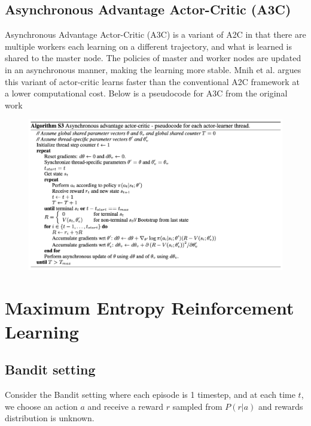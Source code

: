 \documentclass[12pt]{report}
\begin{document}
\subsection{Asynchronous Advantage Actor-Critic (A3C)}

Asynchronous Advantage Actor-Critic (A3C) is a variant of A2C in that there are multiple workers each learning on a different trajectory, and what is learned is shared to the master node. The policies of master and worker nodes are updated in an asynchronous manner, making the learning more stable. Mnih et al. \cite{mnih2016asynchronous} argues this variant of actor-critic learns faster than the conventional A2C framework at a lower computational cost. Below is a pseudocode for A3C from the original work \cite{mnih2016asynchronous}
\begin{figure}[H]
    \center
    \includegraphics[width=.9\linewidth]{figs/A3C.png}
    \label{fig:A3C}
\end{figure}

\section{Maximum Entropy Reinforcement Learning}
\subsection{Bandit setting}
Consider the Bandit setting where each episode is 1 timestep, and at each time $t$, we choose an action $a$ and receive a reward $r$ sampled from $P(r|a)$ and rewards distribution is unknown.\\
\end{document}
